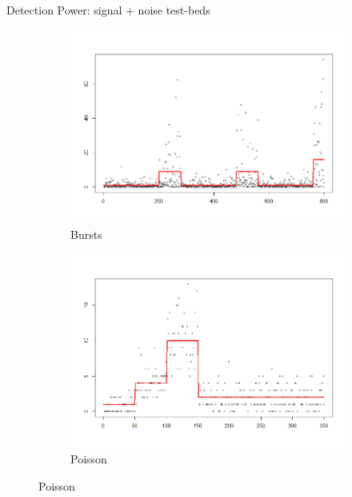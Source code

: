 \documentclass{beamer}
\begin{document}
\begin{frame}{Detection Power: signal + noise test-beds}
\begin{figure}
\begin{subfigure}[b]{0.35\textwidth}
    \includegraphics[width=\textwidth]{../plots/bursts-testbed}
    \caption{Bursts}
\end{subfigure}
\begin{subfigure}[b]{0.35\textwidth}
    \centering
    \includegraphics[width=\textwidth]{../plots/poisson-testbed}
    \caption{Poisson}
\end{subfigure}
\end{figure}
\end{frame}
\end{document}

